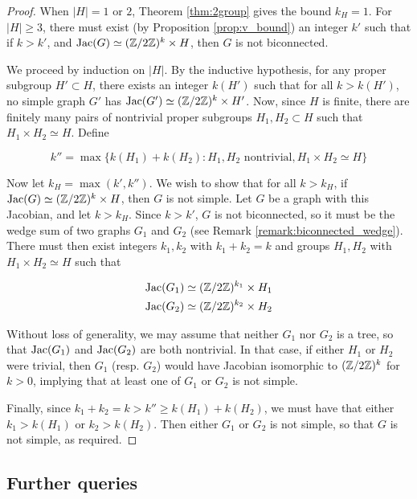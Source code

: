 \documentclass{amsart}
\begin{document}
\begin{proof}
  When $|H| = 1$ or $2$, Theorem \ref{thm:2group} gives the bound $k_H
  = 1$. For $|H| \ge 3$, there must exist (by Proposition
  \ref{prop:v_bound}) an integer $k'$ such that if $k > k'$, and
  $\operatorname{Jac}(G) \simeq (\mathbb{Z}/2\mathbb{Z})^k \times H$, then $G$ is not biconnected.

  We proceed by induction on $|H|$. By the inductive hypothesis, for
  any proper subgroup $H' \subset H$, there exists an integer $k(H')$
  such that for all $k > k(H')$, no simple graph $G'$ has $\operatorname{Jac}(G')
  \simeq (\mathbb{Z}/2\mathbb{Z})^k \times H'$. Now, since $H$ is finite, there are
  finitely many pairs of nontrivial proper subgroups $H_1, H_2 \subset
  H$ such that $H_1 \times H_2 \simeq H$. Define

\begin{equation*}
  k'' = \max\{k(H_1) + k(H_2) : H_1, H_2 \textrm{ nontrivial}, H_1
  \times H_2 \simeq H\}
\end{equation*}

Now let $k_H = \max(k', k'')$. We wish to show that for all $k > k_H$,
if $\operatorname{Jac}(G) \simeq (\mathbb{Z}/2\mathbb{Z})^k \times H$, then $G$ is not simple. Let
$G$ be a graph with this Jacobian, and let $k > k_H$.  Since $k > k'$,
$G$ is not biconnected, so it must be the wedge sum of two graphs
$G_1$ and $G_2$ (see Remark \ref{remark:biconnected_wedge}). There
must then exist integers $k_1, k_2$ with $k_1 + k_2 = k$ and groups
$H_1, H_2$ with $H_1 \times H_2 \simeq H$ such that

\begin{align*}
  \operatorname{Jac}(G_1) &\simeq (\mathbb{Z}/2\mathbb{Z})^{k_1} \times H_1 \\
  \operatorname{Jac}(G_2) &\simeq (\mathbb{Z}/2\mathbb{Z})^{k_2} \times H_2
\end{align*}

Without loss of generality, we may assume that neither $G_1$ nor $G_2$
is a tree, so that $\operatorname{Jac}(G_1)$ and $\operatorname{Jac}(G_2)$ are both nontrivial. In
that case, if either $H_1$ or $H_2$ were trivial, then $G_1$
(resp. $G_2$) would have Jacobian isomorphic to $(\mathbb{Z}/2\mathbb{Z})^k$ for $k >
0$, implying that at least one of $G_1$ or $G_2$ is not simple.

Finally, since $k_1 + k_2 = k > k'' \ge k(H_1) + k(H_2)$, we must have
that either $k_1 > k(H_1)$ or $k_2 > k(H_2)$. Then either $G_1$ or
$G_2$ is not simple, so that $G$ is not simple, as required.
\end{proof}

\subsection{Further queries} 
\end{document}
